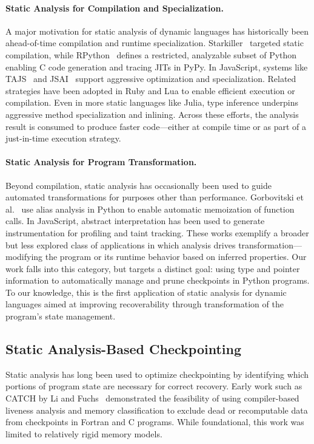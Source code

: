 \paragraph{Static Analysis for Compilation and Specialization.}
A major motivation for static analysis of dynamic languages has historically been ahead-of-time compilation and runtime specialization. Starkiller~\cite{salib2004starkiller} targeted static compilation, while RPython~\cite{ancona2007rpython} defines a restricted, analyzable subset of Python enabling C code generation and tracing JITs in PyPy. In JavaScript, systems like TAJS~\cite{jensen2009type} and JSAI~\cite{kashyap2014jsai} support aggressive optimization and specialization. Related strategies have been adopted in Ruby and Lua to enable efficient execution or compilation. Even in more static languages like Julia, type inference underpins aggressive method specialization and inlining. Across these efforts, the analysis result is consumed to produce faster code—either at compile time or as part of a just-in-time execution strategy.

\paragraph{Static Analysis for Program Transformation.}
Beyond compilation, static analysis has occasionally been used to guide automated transformations for purposes other than performance. Gorbovitski et al.~\cite{gorbovitski2010alias} use alias analysis in Python to enable automatic memoization of function calls. In JavaScript, abstract interpretation has been used to generate instrumentation for profiling and taint tracking. These works exemplify a broader but less explored class of applications in which analysis drives transformation—modifying the program or its runtime behavior based on inferred properties. Our work falls into this category, but targets a distinct goal: using type and pointer information to automatically manage and prune checkpoints in Python programs. To our knowledge, this is the first application of static analysis for dynamic languages aimed at improving recoverability through transformation of the program’s state management.

\subsection{Static Analysis-Based Checkpointing}

Static analysis has long been used to optimize checkpointing by identifying which portions of program state are necessary for correct recovery. Early work such as CATCH by Li and Fuchs~\cite{li1990catch} demonstrated the feasibility of using compiler-based liveness analysis and memory classification to exclude dead or recomputable data from checkpoints in Fortran and C programs. While foundational, this work was limited to relatively rigid memory models.

